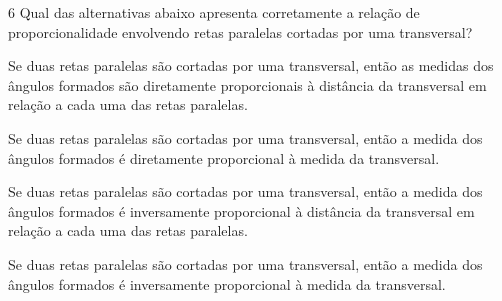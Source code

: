 {%

\num{6}  Qual das alternativas abaixo apresenta corretamente a relação de
proporcionalidade envolvendo retas paralelas cortadas por uma
transversal?

\begin{escolha}
\item Se duas retas paralelas são cortadas por uma transversal, então as
medidas dos ângulos formados são diretamente proporcionais à distância
da transversal em relação a cada uma das retas paralelas.
\item Se duas retas paralelas são cortadas por uma transversal, então a
medida dos ângulos formados é diretamente proporcional à medida da
transversal.
\item Se duas retas paralelas são cortadas por uma transversal, então a
medida dos ângulos formados é inversamente proporcional à distância da
transversal em relação a cada uma das retas paralelas.
\item Se duas retas paralelas são cortadas por uma transversal, então a
medida dos ângulos formados é inversamente proporcional à medida da
transversal.
\end{escolha}



}
